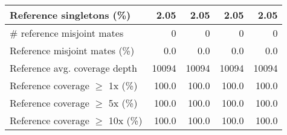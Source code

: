 \documentclass[12pt,a4paper]{article}
\begin{document}
\begin{table}[ht]
\begin{center}
\begin{tabular}{|l*{4}{|r}|}
Reference singletons (\%) & 2.05 & 2.05 & 2.05 & 2.05 \\ \hline
\# reference misjoint mates & 0 & 0 & 0 & 0 \\ \hline
Reference misjoint mates (\%) & 0.0 & 0.0 & 0.0 & 0.0 \\ \hline
Reference avg. coverage depth & 10094 & 10094 & 10094 & 10094 \\ \hline
Reference coverage $\geq$ 1x (\%) & 100.0 & 100.0 & 100.0 & 100.0 \\ \hline
Reference coverage $\geq$ 5x (\%) & 100.0 & 100.0 & 100.0 & 100.0 \\ \hline
Reference coverage $\geq$ 10x (\%) & 100.0 & 100.0 & 100.0 & 100.0 \\ \hline
\end{tabular}
\end{center}
\end{table}
\end{document}
